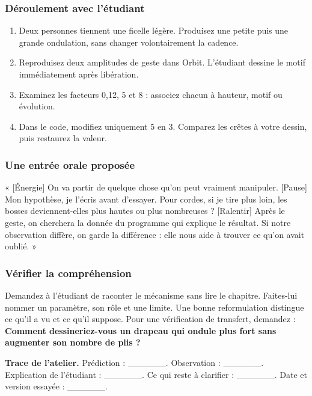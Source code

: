 \documentclass[
  canadien,
  11pt,
  letterpaper,
]{article}
\providecommand{\tightlist}{%
  \setlength{\itemsep}{0pt}\setlength{\parskip}{0pt}}
\begin{document}
\subsubsection{Déroulement avec
l'étudiant}\label{duxe9roulement-avec-luxe9tudiant-2}

\begin{enumerate}
\def\labelenumi{\arabic{enumi}.}
\tightlist
\item
  Deux personnes tiennent une ficelle légère. Produisez une petite puis
  une grande ondulation, sans changer volontairement la cadence.
\item
  Reproduisez deux amplitudes de geste dans Orbit. L'étudiant dessine le
  motif immédiatement après libération.
\item
  Examinez les facteurs 0,12, 5 et 8 : associez chacun à hauteur, motif
  ou évolution.
\item
  Dans le code, modifiez uniquement 5 en 3. Comparez les crêtes à votre
  dessin, puis restaurez la valeur.
\end{enumerate}

\subsubsection{Une entrée orale
proposée}\label{une-entruxe9e-orale-proposuxe9e-2}

« {[}Énergie{]} On va partir de quelque chose qu'on peut vraiment
manipuler. {[}Pause{]} Mon hypothèse, je l'écris avant d'essayer. Pour
cordes, si je tire plus loin, les bosses deviennent-elles plus hautes ou
plus nombreuses ? {[}Ralentir{]} Après le geste, on cherchera la donnée
du programme qui explique le résultat. Si notre observation diffère, on
garde la différence : elle nous aide à trouver ce qu'on avait oublié. »

\subsubsection{Vérifier la
compréhension}\label{vuxe9rifier-la-compruxe9hension-2}

Demandez à l'étudiant de raconter le mécanisme sans lire le chapitre.
Faites-lui nommer un paramètre, son rôle et une limite. Une bonne
reformulation distingue ce qu'il a vu et ce qu'il suppose. Pour une
vérification de transfert, demandez : \textbf{Comment dessineriez-vous
un drapeau qui ondule plus fort sans augmenter son nombre de plis ?}

\textbf{Trace de l'atelier.} Prédiction : \_\_\_\_\_\_. Observation :
\_\_\_\_\_\_. Explication de l'étudiant : \_\_\_\_\_\_. Ce qui reste à
clarifier : \_\_\_\_\_\_. Date et version essayée : \_\_\_\_\_\_.
\end{document}
